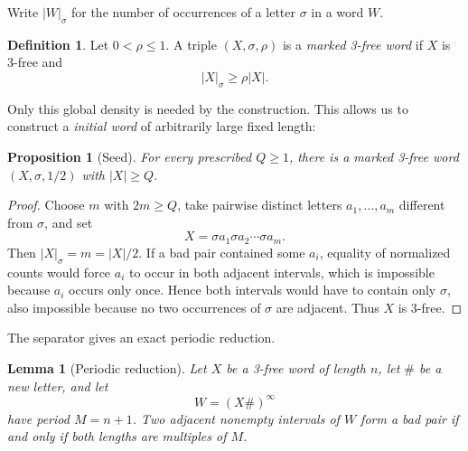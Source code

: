 \documentclass[11pt]{article}
\theoremstyle{plain}
\newtheorem{proposition}{Proposition}[section]
\newtheorem{lemma}{Lemma}[section]
\theoremstyle{definition}
\newtheorem{definition}{Definition}[section]
\theoremstyle{remark}
\begin{document}
Write \(|W|_\sigma\) for the number of occurrences of a letter \(\sigma\) in a word \(W\).

\begin{definition}\label{def:marked-word}
Let $0<\rho\le1$. A triple $(X,\sigma,\rho)$ is a \emph{marked 3-free word} if $X$ is 3-free and
\begin{equation}\label{eq:marked-density}
        |X|_\sigma\ge \rho|X|.
\end{equation}
\end{definition}

Only this global density is needed by the construction. This allows us to construct a \emph{initial word} of arbitrarily large fixed length:

\begin{proposition}[Seed]\label{prop:seed}
For every prescribed \(Q\ge1\), there is a marked 3-free word \((X,\sigma,1/2)\) with \(|X|\ge Q\).
\end{proposition}

\begin{proof}
Choose \(m\) with \(2m\ge Q\), take pairwise distinct letters \(a_1,\ldots,a_m\) different from \(\sigma\), and set
\begin{equation}\label{eq:simple-seed}
        X=\sigma a_1\sigma a_2\cdots\sigma a_m.
\end{equation}
Then \(|X|_\sigma=m=|X|/2\). If a bad pair contained some \(a_i\), equality of normalized counts would force \(a_i\) to occur in both adjacent intervals, which is impossible because \(a_i\) occurs only once. Hence both intervals would have to contain only \(\sigma\), also impossible because no two occurrences of \(\sigma\) are adjacent. Thus \(X\) is 3-free.
\end{proof}

The separator gives an exact periodic reduction.

\begin{lemma}[Periodic reduction]\label{lem:periodic-reduction}
Let \(X\) be a 3-free word of length \(n\), let \(\#\) be a new letter, and let
\[
        W=(X\#)^\infty
\]
have period \(M=n+1\). Two adjacent nonempty intervals of \(W\) form a bad pair if and only if both lengths are multiples of \(M\).
\end{lemma}
\end{document}
